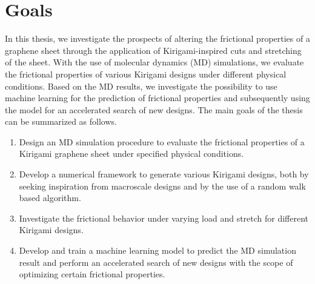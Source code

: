 \section{Goals}\label{sec:goals} In this thesis, we investigate the prospects of
altering the frictional properties of a graphene sheet through the application
of Kirigami-inspired cuts and stretching of the sheet. With the use of molecular
dynamics (\acrshort{MD}) simulations, we evaluate the frictional properties of
various Kirigami designs under different physical conditions. Based on the
\acrshort{MD} results, we investigate the possibility to use machine learning
for the prediction of frictional properties and subsequently using the model for
an accelerated search of new designs. The main goals of the thesis can be
summarized as follows.
\begin{enumerate} 
    \item Design an \acrshort{MD} simulation procedure to evaluate the
    frictional properties of a Kirigami graphene sheet under specified physical
    conditions.
    \item Develop a numerical framework to generate various Kirigami designs,
    both by seeking inspiration from macroscale designs and by the use of a
    random walk based algorithm.
    \item Investigate the frictional behavior under varying load and stretch for
    different Kirigami designs.
    \item Develop and train a machine learning model to predict the
    \acrshort{MD} simulation result and perform an accelerated search of new
    designs with the scope of optimizing certain frictional properties.
\end{enumerate}






